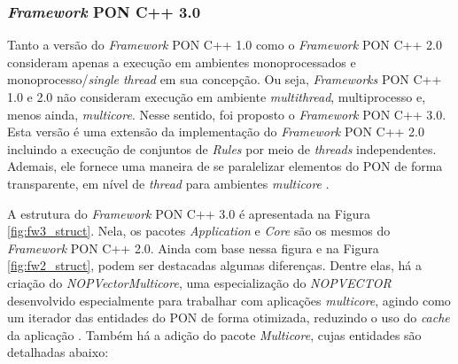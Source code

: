 \subsubsection{\textit{Framework} PON C++ 3.0}\label{sec:fw3}

Tanto a versão do \textit{Framework} PON C++ 1.0 como o \textit{Framework} PON
C++ 2.0 consideram apenas a execução em ambientes monoprocessados e
monoprocesso/\textit{single thread} em sua concepção. Ou seja, \textit{Frameworks}
PON C++ 1.0 e 2.0 não consideram execução em ambiente \textit{multithread},
multiprocesso e, menos ainda, \textit{multicore}. Nesse sentido, foi proposto o
\textit{Framework} PON C++ 3.0. Esta versão é uma extensão da implementação do
\textit{Framework} PON C++ 2.0 incluindo a execução de conjuntos de
\textit{Rules} por meio de \textit{threads} independentes. Ademais, ele fornece
uma maneira de se paralelizar elementos do PON de forma transparente, em nível
de \textit{thread} para ambientes \textit{multicore} \cite{belmonte_2012}.

A estrutura do \textit{Framework} PON C++ 3.0 é apresentada na Figura
\ref{fig:fw3_struct}. Nela, os pacotes \textit{Application} e \textit{Core} são
os mesmos do \textit{Framework} PON C++ 2.0. Ainda com base nessa figura e na
Figura \ref{fig:fw2_struct}, podem ser destacadas algumas diferenças. Dentre
elas, há a criação do \textit{NOPVectorMulticore}, uma especialização do
\textit{NOPVECTOR} desenvolvido especialmente para trabalhar com aplicações
\textit{multicore}, agindo como um iterador das entidades do PON de forma
otimizada, reduzindo o uso do \textit{cache} da aplicação
\cite{belmonte_2012,schutz_2018}. Também há a adição do pacote
\textit{Multicore}, cujas entidades são detalhadas abaixo:

